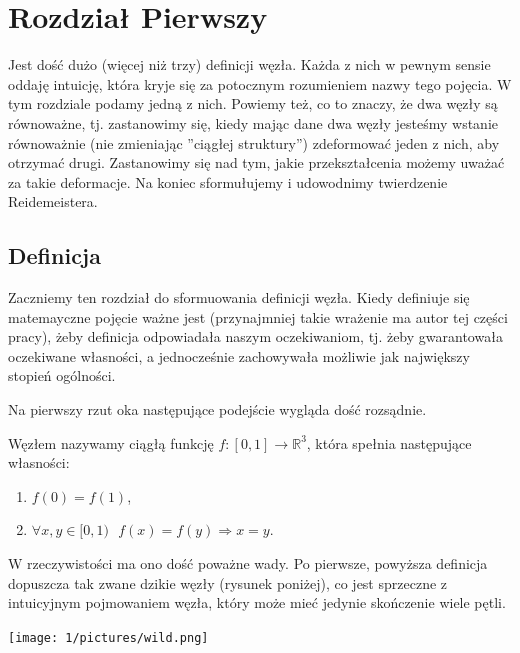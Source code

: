 
\newpage

\section{Rozdział Pierwszy}

Jest dość dużo (więcej niż trzy) definicji węzła. Każda z nich w pewnym sensie oddaję intuicję, która kryje się za potocznym rozumieniem nazwy tego pojęcia. W tym rozdziale podamy 
jedną z nich. 
Powiemy też, co to znaczy, że dwa węzły są równoważne, tj. zastanowimy się, kiedy mając dane dwa węzły jesteśmy wstanie równoważnie (nie zmieniając ''ciągłej struktury'') 
zdeformować jeden z nich, aby otrzymać drugi. Zastanowimy się nad tym, jakie przekształcenia możemy uważać za takie deformacje. Na koniec sformułujemy i udowodnimy 
twierdzenie Reidemeistera.

\subsection{Definicja}

Zaczniemy ten rozdział do sformuowania definicji węzła. Kiedy definiuje się matemayczne pojęcie ważne jest (przynajmniej takie wrażenie ma autor tej części pracy), 
żeby definicja odpowiadała naszym oczekiwaniom, tj. żeby gwarantowała oczekiwane własności, a jednocześnie zachowywała możliwie jak największy 
stopień ogólności. 

Na pierwszy rzut oka następujące podejście wygląda dość rozsądnie.


\begin{definicja}
\label{zla_definicja}
 Węzłem nazywamy ciągłą funkcję $f\colon[0,1]\to\mathbb{R}^3$, która spełnia następujące własności:
 \begin{enumerate}
  \item $f(0) = f(1)$,
  \item $\forall x,y\in[0,1) \ \ \ f(x) = f(y)\Rightarrow x = y$.
 \end{enumerate}
\end{definicja}

W rzeczywistości ma ono dość poważne wady.
Po pierwsze, powyższa definicja dopuszcza tak zwane dzikie węzły (rysunek poniżej), co jest sprzeczne z intuicyjnym pojmowaniem węzła, który może mieć 
jedynie skończenie wiele pętli. 

\begin{minipage}{0.3\textwidth}
	\begin{center}

	\texttt{[image: 1/pictures/wild.png]}
	\end{center}
	\end{minipage}


